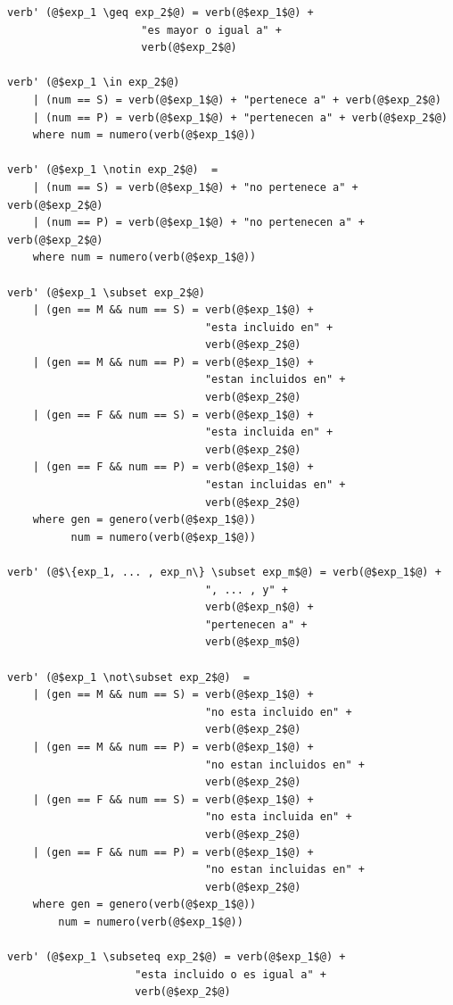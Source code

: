 \begin{mdframed}[style=codebox]
\begin{verbatim}
verb' (@$exp_1 \geq exp_2$@) = verb(@$exp_1$@) +  
                     "es mayor o igual a" +  
                     verb(@$exp_2$@) 

verb' (@$exp_1 \in exp_2$@)
    | (num == S) = verb(@$exp_1$@) + "pertenece a" + verb(@$exp_2$@) 
    | (num == P) = verb(@$exp_1$@) + "pertenecen a" + verb(@$exp_2$@) 
    where num = numero(verb(@$exp_1$@))

verb' (@$exp_1 \notin exp_2$@)  = 
    | (num == S) = verb(@$exp_1$@) + "no pertenece a" + verb(@$exp_2$@) 
    | (num == P) = verb(@$exp_1$@) + "no pertenecen a" + verb(@$exp_2$@) 
    where num = numero(verb(@$exp_1$@))

verb' (@$exp_1 \subset exp_2$@)
    | (gen == M && num == S) = verb(@$exp_1$@) + 
                               "esta incluido en" + 
                               verb(@$exp_2$@) 
    | (gen == M && num == P) = verb(@$exp_1$@) + 
                               "estan incluidos en" + 
                               verb(@$exp_2$@) 
    | (gen == F && num == S) = verb(@$exp_1$@) + 
                               "esta incluida en" + 
                               verb(@$exp_2$@) 
    | (gen == F && num == P) = verb(@$exp_1$@) + 
                               "estan incluidas en" + 
                               verb(@$exp_2$@) 
    where gen = genero(verb(@$exp_1$@))
          num = numero(verb(@$exp_1$@))

verb' (@$\{exp_1, ... , exp_n\} \subset exp_m$@) = verb(@$exp_1$@) +  
                               ", ... , y" +  
                               verb(@$exp_n$@) +  
                               "pertenecen a" +
                               verb(@$exp_m$@)

verb' (@$exp_1 \not\subset exp_2$@)  = 
    | (gen == M && num == S) = verb(@$exp_1$@) + 
                               "no esta incluido en" + 
                               verb(@$exp_2$@) 
    | (gen == M && num == P) = verb(@$exp_1$@) + 
                               "no estan incluidos en" + 
                               verb(@$exp_2$@) 
    | (gen == F && num == S) = verb(@$exp_1$@) + 
                               "no esta incluida en" + 
                               verb(@$exp_2$@) 
    | (gen == F && num == P) = verb(@$exp_1$@) + 
                               "no estan incluidas en" + 
                               verb(@$exp_2$@) 
    where gen = genero(verb(@$exp_1$@))
        num = numero(verb(@$exp_1$@))

verb' (@$exp_1 \subseteq exp_2$@) = verb(@$exp_1$@) +  
                    "esta incluido o es igual a" +  
                    verb(@$exp_2$@) 


\end{verbatim}
\end{mdframed}
